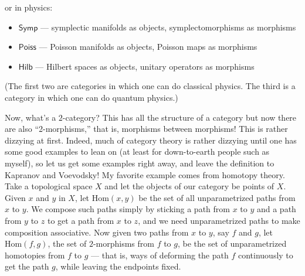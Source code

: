 \documentclass{article}
\def\tightlist{}
\begin{document}
or in physics:

\begin{itemize}
\tightlist
\item
  \(\mathsf{Symp}\) --- symplectic manifolds as objects,
  symplectomorphisms as morphisms
\item
  \(\mathsf{Poiss}\) --- Poisson manifolds as objects, Poisson maps as
  morphisms
\item
  \(\mathsf{Hilb}\) --- Hilbert spaces as objects, unitary operators as
  morphisms
\end{itemize}

(The first two are categories in which one can do classical physics. The
third is a category in which one can do quantum physics.)

Now, what's a \(2\)-category? This has all the structure of a category
but now there are also ``2-morphisms,'' that is, morphisms between
morphisms! This is rather dizzying at first. Indeed, much of category
theory is rather dizzying until one has some good examples to lean on
(at least for down-to-earth people such as myself), so let us get some
examples right away, and leave the definition to Kapranov and Voevodsky!
My favorite example comes from homotopy theory. Take a topological space
\(X\) and let the objects of our category be points of \(X\). Given
\(x\) and \(y\) in \(X\), let \(\mathrm{Hom}(x,y)\) be the set of all
unparametrized paths from \(x\) to \(y\). We compose such paths simply
by sticking a path from \(x\) to \(y\) and a path from \(y\) to \(z\) to
get a path from \(x\) to \(z\), and we need unparametrized paths to make
composition associative. Now given two paths from \(x\) to \(y\), say
\(f\) and \(g\), let \(\mathrm{Hom}(f,g)\), the set of \(2\)-morphisms
from \(f\) to \(g\), be the set of unparametrized homotopies from \(f\)
to \(g\) --- that is, ways of deforming the path \(f\) continuously to
get the path \(g\), while leaving the endpoints fixed.
\end{document}
